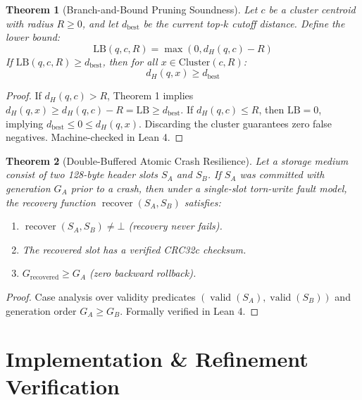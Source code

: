 \documentclass[10pt,twocolumn,a4paper]{article}
\newtheorem{theorem}{Theorem}
\begin{document}
\begin{theorem}[Branch-and-Bound Pruning Soundness]
Let $c$ be a cluster centroid with radius $R \ge 0$, and let $d_{\text{best}}$ be the current top-$k$ cutoff distance. Define the lower bound:
\begin{equation}
\mathrm{LB}(q, c, R) = \max(0, d_H(q, c) - R)
\end{equation}
If $\mathrm{LB}(q, c, R) \ge d_{\text{best}}$, then for all $x \in \mathrm{Cluster}(c, R)$:
\begin{equation}
d_H(q, x) \ge d_{\text{best}}
\end{equation}
\end{theorem}
\begin{proof}
If $d_H(q, c) > R$, Theorem 1 implies $d_H(q, x) \ge d_H(q, c) - R = \mathrm{LB} \ge d_{\text{best}}$. If $d_H(q, c) \le R$, then $\mathrm{LB} = 0$, implying $d_{\text{best}} \le 0 \le d_H(q, x)$. Discarding the cluster guarantees zero false negatives. Machine-checked in Lean 4.
\end{proof}

\begin{theorem}[Double-Buffered Atomic Crash Resilience]
Let a storage medium consist of two 128-byte header slots $S_A$ and $S_B$. If $S_A$ was committed with generation $G_A$ prior to a crash, then under a single-slot torn-write fault model, the recovery function $\operatorname{recover}(S_A, S_B)$ satisfies:
\begin{enumerate}
    \item $\operatorname{recover}(S_A, S_B) \ne \bot$ (recovery never fails).
    \item The recovered slot has a verified CRC32c checksum.
    \item $G_{\text{recovered}} \ge G_A$ (zero backward rollback).
\end{enumerate}
\end{theorem}
\begin{proof}
Case analysis over validity predicates $(\operatorname{valid}(S_A), \operatorname{valid}(S_B))$ and generation order $G_A \ge G_B$. Formally verified in Lean 4.
\end{proof}

\section{Implementation \& Refinement Verification}
\end{document}
